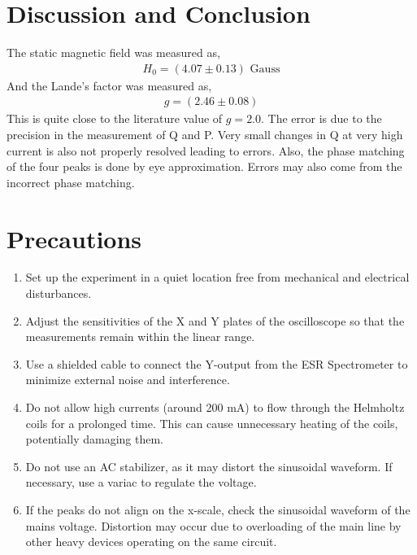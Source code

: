 \section{Discussion and Conclusion}

The static magnetic field was measured as,
\begin{align*}
    H_0 = (4.07 \pm 0.13) \text{ Gauss}
\end{align*}
And the Lande's factor was measured as, 
\begin{align*}
    g = (2.46 \pm 0.08)
\end{align*}
This is quite close to the literature value of $g= 2.0$. The error is due to the precision in the measurement of Q and P. Very small changes in Q at very high current is also not properly resolved leading to errors. Also, the phase matching of the four peaks is done by eye approximation. Errors may also come from the incorrect phase matching.

\section{Precautions}

    \begin{enumerate}
        \item Set up the experiment
        in a quiet location free from mechanical and
        electrical disturbances.
        \item Adjust the sensitivities of the X and Y plates of the oscilloscope so that the measurements remain within
        the linear range.
        \item Use a
        shielded cable to connect the Y-output from the
        ESR Spectrometer to minimize external noise
        and interference.
        \item Do not allow high currents (around 200
        mA) to flow through the Helmholtz coils for
        a prolonged time. This can cause unnecessary
        heating of the coils, potentially damaging them.
        \item Do not use an AC stabilizer, as it may distort the sinusoidal waveform. If necessary, use a variac to regulate the
        voltage.
        \item If the
        peaks do not align on the x-scale, check the sinusoidal waveform of the mains voltage. Distortion may occur due to overloading of the main
        line by other heavy devices operating on the
        same circuit.
    \end{enumerate}

